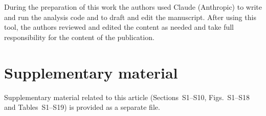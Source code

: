 \documentclass[preprint,12pt,authoryear,a4paper]{elsarticle}
\begin{document}
During the preparation of this work the authors used Claude (Anthropic) to write and run the analysis code and to draft and edit the manuscript. After using this tool, the authors reviewed and edited the content as needed and take full responsibility for the content of the publication.




\appendix
\section{Supplementary material}\label{app:supp}

Supplementary material related to this article (Sections~S1--S10, Figs.~S1--S18 and Tables~S1--S19) is provided as a separate file.
\end{document}
